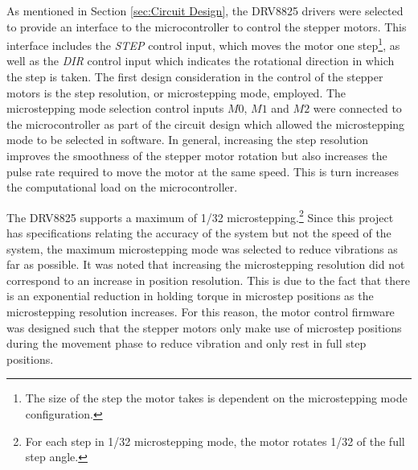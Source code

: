 %


As mentioned in Section \ref{sec:Circuit Design}, the DRV8825 drivers were selected to provide an interface to the microcontroller to control the stepper motors. This interface includes the \textit{STEP} control input, which moves the motor one step\footnote{The size of the step the motor takes is dependent on the microstepping mode configuration.}, as well as the \textit{DIR} control input which indicates the rotational direction in which the step is taken. The first design consideration in the control of the stepper motors is the step resolution, or microstepping mode, employed. The microstepping mode selection control inputs $M0$, $M1$ and $M2$ were connected to the microcontroller as part of the circuit design which allowed the microstepping mode to be selected in software. In general, increasing the step resolution improves the smoothness of the stepper motor rotation but also increases the pulse rate required to move the motor at the same speed. This is turn increases the computational load on the microcontroller.

The DRV8825 supports a maximum of 1/32 microstepping.\footnote{For each step in 1/32 microstepping mode, the motor rotates 1/32 of the full step angle.} Since this project has specifications relating the accuracy of the system but not the speed of the system, the maximum microstepping mode was selected to reduce vibrations as far as possible. It was noted that increasing the microstepping resolution did not correspond to an increase in position resolution. This is due to the fact that there is an exponential reduction in holding torque in microstep positions as the microstepping resolution increases. For this reason, the motor control firmware was designed such that the stepper motors only make use of microstep positions during the movement phase to reduce vibration and only rest in full step positions.

